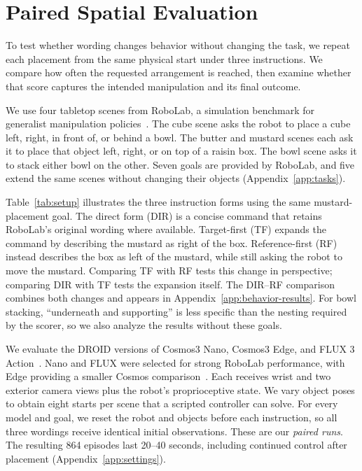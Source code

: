\documentclass{article}
\begin{document}
\section{Paired Spatial Evaluation}
To test whether wording changes behavior without changing the task, we repeat each placement from the same physical start under three instructions. We compare how often the requested arrangement is reached, then examine whether that score captures the intended manipulation and its final outcome.

We use four tabletop scenes from RoboLab, a simulation benchmark for generalist manipulation policies~\citep{yang2026robolab}. The cube scene asks the robot to place a cube left, right, in front of, or behind a bowl. The butter and mustard scenes each ask it to place that object left, right, or on top of a raisin box. The bowl scene asks it to stack either bowl on the other. Seven goals are provided by RoboLab, and five extend the same scenes without changing their objects (Appendix~\ref{app:tasks}).

Table~\ref{tab:setup} illustrates the three instruction forms using the same mustard-placement goal. The direct form (DIR) is a concise command that retains RoboLab's original wording where available. Target-first (TF) expands the command by describing the mustard as right of the box. Reference-first (RF) instead describes the box as left of the mustard, while still asking the robot to move the mustard. Comparing TF with RF tests this change in perspective; comparing DIR with TF tests the expansion itself. The DIR--RF comparison combines both changes and appears in Appendix~\ref{app:behavior-results}. For bowl stacking, ``underneath and supporting'' is less specific than the nesting required by the scorer, so we also analyze the results without these goals.

We evaluate the DROID versions of Cosmos3 Nano, Cosmos3 Edge, and FLUX 3 Action~\citep{nvidia2026nano,nvidia2026edge,bfl2026fluxaction}. Nano and FLUX were selected for strong RoboLab performance, with Edge providing a smaller Cosmos comparison~\citep{robolab2026leaderboard}. Each receives wrist and two exterior camera views plus the robot's proprioceptive state. We vary object poses to obtain eight starts per scene that a scripted controller can solve. For every model and goal, we reset the robot and objects before each instruction, so all three wordings receive identical initial observations. These are our \emph{paired runs}. The resulting 864 episodes last 20--40 seconds, including continued control after placement (Appendix~\ref{app:settings}).
\end{document}
